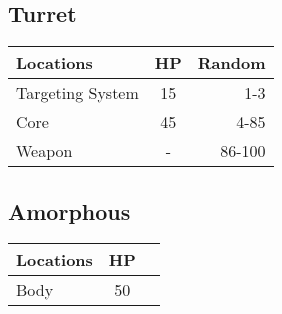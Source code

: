 \begin{multicols}{2}
\subsection{Turret}
\begin{minipage}{\columnwidth}
	\begin{tabularx}{\columnwidth}{|X|c|r|}
		\hline
		Locations        & HP & Random \\ \hline
		Targeting System & 15 &    1-3 \\ \hline
		Core             & 45 &   4-85 \\ \hline
		Weapon           & -  & 86-100 \\ \hline
	\end{tabularx}
\end{minipage}

\subsection{Amorphous}
\begin{minipage}{\columnwidth}
	\begin{tabularx}{\columnwidth}{|X|c|r|}
		\hline
		Locations	& HP & \\ \hline
		Body		& 50 & \\ \hline
	\end{tabularx}
\end{minipage}

\end{multicols}
